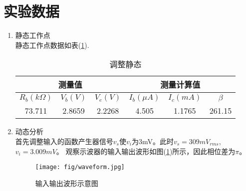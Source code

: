 \documentclass[a4paper]{article}
\begin{document}
\section{实验数据}
\begin{enumerate}
\item 静态工作点\\
静态工作点数据如表(\ref{table1}).
\begin{table}[!h]
\centering
\caption{调整静态}
\label{table1}
\begin{tabular}{c|c|c|c|c|c}
\hline
\multicolumn{3}{c|}{测量值}             & \multicolumn{3}{c}{测量计算值}         \\ \hline
$R_b(k\Omega)$ & $V_b(V)$ & $V_e(V)$ & $I_b(\mu A)$ & $I_c(mA)$ & $\beta$ \\ \hline
73.711                  & 2.8659     & 2.2268     & 4.505             & 1.1765       & 261.15        \\ \hline
\end{tabular}
\end{table}
\item 动态分析\\
首先调整输入的函数产生器信号$v_s$使$v_i$为3mV。此时$v_s = 309 mV_{rms}$, $v_i = 3.009 mV$。
观察示波器的输入输出波形如图(\ref{wf})所示，因此相位差为$\pi$。
\begin{figure}[!h]
\centering
\texttt{[image: fig/waveform.jpg]}\\
\caption{输入输出波形示意图}\label{wf}
\end{figure}


\end{enumerate}
\end{document}

